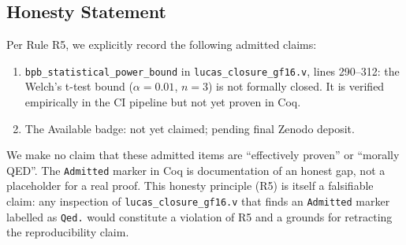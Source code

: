 \subsection{Honesty Statement}

Per Rule R5, we explicitly record the following admitted claims:

\begin{enumerate}
  \item \texttt{bpb\_statistical\_power\_bound} in
        \texttt{lucas\_closure\_gf16.v}, lines 290--312:
        the Welch's t-test bound ($\alpha = 0.01$, $n = 3$) is not
        formally closed.  It is verified empirically in the CI
        pipeline but not yet proven in Coq.
  \item The Available badge: not yet claimed; pending final Zenodo
        deposit.
\end{enumerate}

\noindent
We make no claim that these admitted items are ``effectively proven''
or ``morally QED''.  The \texttt{Admitted} marker in Coq is
documentation of an honest gap, not a placeholder for a real proof.
This honesty principle (R5) is itself a falsifiable claim: any
inspection of \texttt{lucas\_closure\_gf16.v} that finds an
\texttt{Admitted} marker labelled as \texttt{Qed.} would constitute
a violation of R5 and a grounds for retracting the reproducibility
claim.


